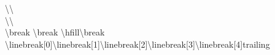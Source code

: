 \documentclass[11pt,twoside]{article}
\begin{document}
  \noindent
  \textbackslash\textbackslash\\
  \textbackslash\textbackslash\\\*
  \textbackslash break\break
  \textbackslash break\break
  \textbackslash hfill\textbackslash break\hfill\break
  \textbackslash linebreak[0]\linebreak[0]
  \textbackslash linebreak[1]\linebreak[1]
  \textbackslash linebreak[2]\linebreak[2]
  \textbackslash linebreak[3]\linebreak[3]
  \textbackslash linebreak[4]\linebreak[4]
  trailing\\
\end{document}
